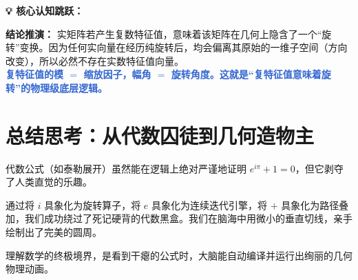 \documentclass[12pt, a4paper]{article}
\newenvironment{insight}{
    \def\FrameCommand{\fboxsep=1em\colorbox{graybg}}
    \MakeFramed{\advance\hsize-\width\FrameRestore}
    \textbf{\textcolor{primary}{\large 💡 核心认知跳跃：}} \par\vspace{0.5em}
}{
    \endMakeFramed
}
\begin{document}
\begin{insight}
    \textbf{结论推演：} 实矩阵若产生复数特征值，意味着该矩阵在几何上隐含了一个“旋转”变换。因为任何实向量在经历纯旋转后，均会偏离其原始的一维子空间（方向改变），所以必然不存在实数特征值向量。\\
    \textcolor{highlight}{\textbf{复特征值的模 $=$ 缩放因子，幅角 $=$ 旋转角度。这就是“复特征值意味着旋转”的物理级底层逻辑。}}
\end{insight}

\section{总结思考：从代数囚徒到几何造物主}
代数公式（如泰勒展开）虽然能在逻辑上绝对严谨地证明 $e^{i\pi} + 1 = 0$，但它剥夺了人类直觉的乐趣。

通过将 $i$ 具象化为旋转算子，将 $e$ 具象化为连续迭代引擎，将 $+$ 具象化为路径叠加，我们成功绕过了死记硬背的代数黑盒。我们在脑海中用微小的垂直切线，亲手绘制出了完美的圆周。

理解数学的终极境界，是看到干瘪的公式时，大脑能自动编译并运行出绚丽的几何物理动画。
\end{document}
